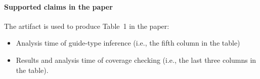 \paragraph{Supported claims in the paper}

The artifact is used to produce Table~1 in the paper:
\begin{itemize}
  \item Analysis time of guide-type inference (i.e., the fifth column in the
        table)
  \item Results and analysis time of coverage checking (i.e., the last three
        columns in the table).
\end{itemize}
